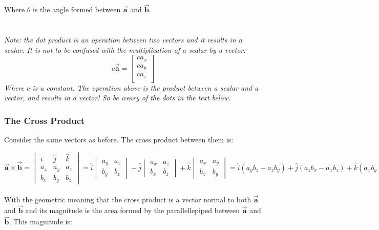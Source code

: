 \documentclass[11pt]{article}
\begin{document}
\noindent
Where $\theta$ is the angle formed between $\vec{\bm{a}}$ and $\vec{\bm{b}}$.\\ \\ \\
\noindent
\emph{Note: the dot product is an operation between two vectors and it results in a scalar. It is not to be confused with the multiplication of a scalar by a vector:}
\begin{equation*}
    c\vec{\bm{a}} = \begin{bmatrix}
        ca_x \\
        ca_y \\
        ca_z \\
    \end{bmatrix}
\end{equation*}
\emph{Where $c$ is a constant. The operation above is the product between a scalar and a vector, and results in a vector! So be weary of the dots in the text below.}

\subsubsection{The Cross Product}
Consider the same vectors as before. The cross product between them is:

\begin{equation*}
    \vec{\bm{a}} \times \vec{\bm{b}} = \begin{vmatrix}
        \hat{i} & \hat{j} & \hat{k} \\
        a_x & a_y & a_z \\
        b_x & b_y & b_z
    \end{vmatrix} = \hat{i}\begin{vmatrix}
        a_y&a_z\\b_y&b_z
    \end{vmatrix} - \hat{j}\begin{vmatrix}
        a_x&a_z\\b_x&b_z
    \end{vmatrix} + \hat{k}\begin{vmatrix}
        a_x&a_y\\b_x&b_y
    \end{vmatrix} = \hat{i}(a_yb_z - a_zb_y) + \hat{j}(a_zb_x-a_xb_z) + \hat{k}(a_xb_y - a_yb_x)
\end{equation*}\\

\noindent
With the geometric meaning that the cross product is a vector normal to both $\vec{\bm{a}}$ and $\vec{\bm{b}}$ and its magnitude is the area formed by the parallellepiped between $\vec{\bm{a}}$ and $\vec{\bm{b}}$. This magnitude is:
\end{document}
